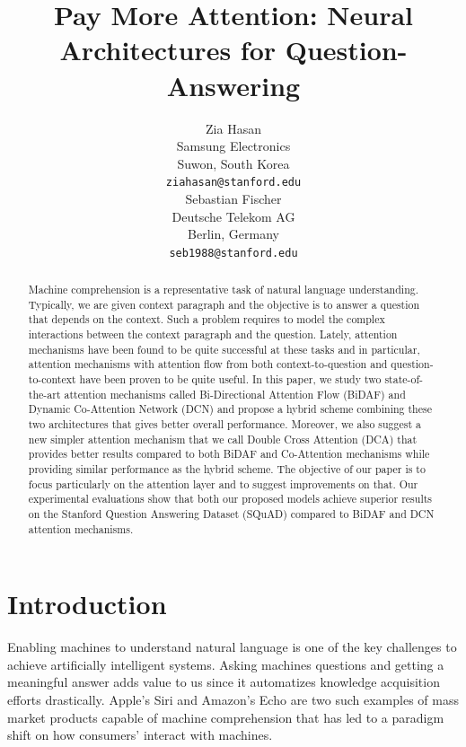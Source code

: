 \documentclass{article} %
\title{Pay More Attention: Neural Architectures for Question-Answering}
\author{
Zia Hasan\\
Samsung Electronics\\
Suwon, South Korea\\
\texttt{ziahasan@stanford.edu} \\
\And
Sebastian Fischer\\
Deutsche Telekom AG \\
Berlin, Germany \\
\texttt{seb1988@stanford.edu} \\
}
\begin{document}
\maketitle

\begin{abstract}
Machine comprehension is a representative task of natural language understanding. Typically, we are given context paragraph and the objective is to answer a question that depends on the context. Such a problem requires to model the complex interactions between the context paragraph and the question. Lately, attention mechanisms have been found to be quite successful at these tasks and in particular, attention mechanisms with attention flow from both context-to-question and question-to-context have been proven to be quite useful. In this paper, we study two state-of-the-art attention mechanisms called Bi-Directional Attention Flow (BiDAF) and Dynamic Co-Attention Network (DCN) and propose a hybrid scheme combining these two architectures that gives better overall performance. Moreover, we also suggest a new simpler attention mechanism that we call Double Cross Attention (DCA) that provides better results compared to both BiDAF and Co-Attention mechanisms while providing similar performance as the hybrid scheme. The objective of our paper is to focus particularly on the attention layer and to suggest improvements on that. Our experimental evaluations show that both our proposed models achieve superior results on the Stanford Question Answering Dataset (SQuAD) compared to BiDAF and DCN attention mechanisms.
\end{abstract}

\section{Introduction}
Enabling machines to understand natural language is one of the key challenges to achieve artificially intelligent systems. Asking machines questions and getting a meaningful answer adds value to us since it automatizes knowledge acquisition efforts drastically. Apple's Siri and Amazon's Echo are two such examples of mass market products capable of machine comprehension that has led to a paradigm shift on how consumers' interact with machines.
 
\end{document}
